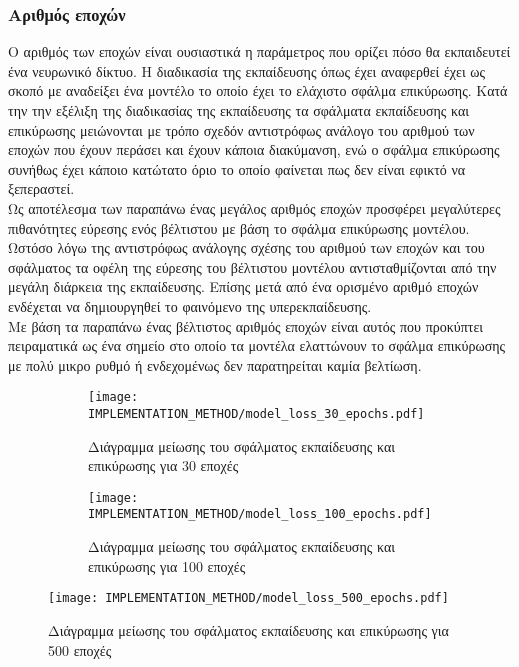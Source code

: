 \subsubsection{Αριθμός εποχών}
Ο αριθμός των εποχών είναι ουσιαστικά η παράμετρος που ορίζει πόσο θα εκπαιδευτεί ένα νευρωνικό δίκτυο. Η διαδικασία της εκπαίδευσης όπως έχει αναφερθεί έχει ως σκοπό με αναδείξει ένα μοντέλο το οποίο έχει το ελάχιστο σφάλμα επικύρωσης. Κατά την την εξέλιξη της διαδικασίας της εκπαίδευσης τα σφάλματα εκπαίδευσης και επικύρωσης μειώνονται με τρόπο σχεδόν αντιστρόφως ανάλογο του αριθμού των εποχών που έχουν περάσει και έχουν κάποια διακύμανση, ενώ ο σφάλμα επικύρωσης συνήθως έχει κάποιο κατώτατο όριο το οποίο φαίνεται πως δεν είναι εφικτό να ξεπεραστεί.\\

Ως αποτέλεσμα των παραπάνω ένας μεγάλος αριθμός εποχών προσφέρει μεγαλύτερες πιθανότητες εύρεσης ενός βέλτιστου με βάση το σφάλμα επικύρωσης μοντέλου. Ωστόσο λόγω της αντιστρόφως ανάλογης σχέσης του αριθμού των εποχών και του σφάλματος τα οφέλη της εύρεσης του βέλτιστου μοντέλου αντισταθμίζονται από την μεγάλη διάρκεια της εκπαίδευσης. Επίσης μετά από ένα ορισμένο αριθμό εποχών ενδέχεται να δημιουργηθεί το φαινόμενο της υπερεκπαίδευσης.\\

Με βάση τα παραπάνω ένας βέλτιστος αριθμός εποχών είναι αυτός που προκύπτει πειραματικά ως ένα σημείο στο οποίο τα μοντέλα ελαττώνουν το σφάλμα επικύρωσης με πολύ μικρο ρυθμό ή ενδεχομένως δεν παρατηρείται καμία βελτίωση.

\begin{figure}[H]
    \begin{subfigure}{0.5\textwidth}
        \texttt{[image: IMPLEMENTATION\_METHOD/model\_loss\_30\_epochs.pdf]}
        \caption{Διάγραμμα μείωσης του σφάλματος εκπαίδευσης και επικύρωσης για 30 εποχές}
        \label{fig:epochs30}
    \end{subfigure}
    \begin{subfigure}{0.5\textwidth}
        \texttt{[image: IMPLEMENTATION\_METHOD/model\_loss\_100\_epochs.pdf]}
        \caption{Διάγραμμα μείωσης του σφάλματος εκπαίδευσης και επικύρωσης για 100 εποχές}
        \label{fig:epochs100}
    \end{subfigure}
    \caption{}
\end{figure}
\begin{figure}[H]
    \centering
    \texttt{[image: IMPLEMENTATION\_METHOD/model\_loss\_500\_epochs.pdf]}
    \caption{Διάγραμμα μείωσης του σφάλματος εκπαίδευσης και επικύρωσης για 500 εποχές}
    \label{fig:epochs500}
\end{figure}

